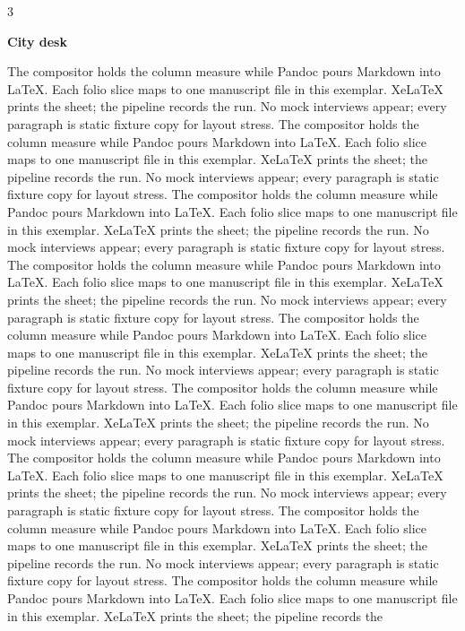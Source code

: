 \documentclass[
]{article}
\begin{document}
\begin{multicols}{3}

\textbf{City desk}

The compositor holds the column measure while Pandoc pours Markdown into
LaTeX. Each folio slice maps to one manuscript file in this exemplar.
XeLaTeX prints the sheet; the pipeline records the run. No mock
interviews appear; every paragraph is static fixture copy for layout
stress. The compositor holds the column measure while Pandoc pours
Markdown into LaTeX. Each folio slice maps to one manuscript file in
this exemplar. XeLaTeX prints the sheet; the pipeline records the run.
No mock interviews appear; every paragraph is static fixture copy for
layout stress. The compositor holds the column measure while Pandoc
pours Markdown into LaTeX. Each folio slice maps to one manuscript file
in this exemplar. XeLaTeX prints the sheet; the pipeline records the
run. No mock interviews appear; every paragraph is static fixture copy
for layout stress. The compositor holds the column measure while Pandoc
pours Markdown into LaTeX. Each folio slice maps to one manuscript file
in this exemplar. XeLaTeX prints the sheet; the pipeline records the
run. No mock interviews appear; every paragraph is static fixture copy
for layout stress. The compositor holds the column measure while Pandoc
pours Markdown into LaTeX. Each folio slice maps to one manuscript file
in this exemplar. XeLaTeX prints the sheet; the pipeline records the
run. No mock interviews appear; every paragraph is static fixture copy
for layout stress. The compositor holds the column measure while Pandoc
pours Markdown into LaTeX. Each folio slice maps to one manuscript file
in this exemplar. XeLaTeX prints the sheet; the pipeline records the
run. No mock interviews appear; every paragraph is static fixture copy
for layout stress. The compositor holds the column measure while Pandoc
pours Markdown into LaTeX. Each folio slice maps to one manuscript file
in this exemplar. XeLaTeX prints the sheet; the pipeline records the
run. No mock interviews appear; every paragraph is static fixture copy
for layout stress. The compositor holds the column measure while Pandoc
pours Markdown into LaTeX. Each folio slice maps to one manuscript file
in this exemplar. XeLaTeX prints the sheet; the pipeline records the
run. No mock interviews appear; every paragraph is static fixture copy
for layout stress. The compositor holds the column measure while Pandoc
pours Markdown into LaTeX. Each folio slice maps to one manuscript file
in this exemplar. XeLaTeX prints the sheet; the pipeline records the

\end{multicols}
\end{document}

